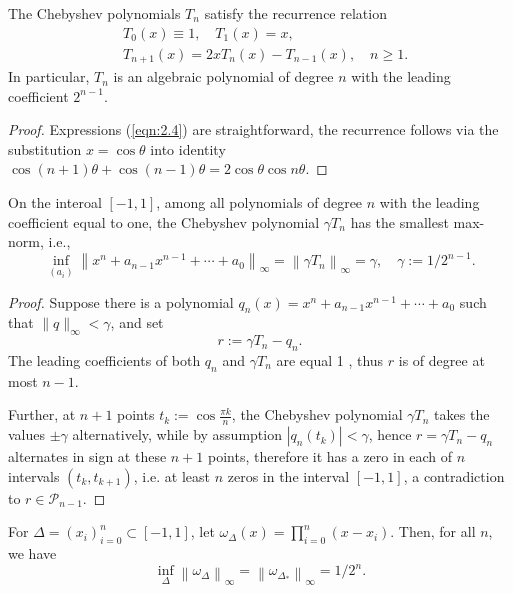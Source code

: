 \documentclass[a4paper]{article}
\begin{document}
\begin{lemma}
    The Chebyshev polynomials $T_n$ satisfy the recurrence relation
    \begin{align}
        & T_0(x) \equiv 1, \quad T_1(x)=x, \label{eqn:2.4}\\
        & T_{n+1}(x)=2 x T_n(x)-T_{n-1}(x), \quad n \geq 1 .\label{eqn:2.5}
    \end{align}
    In particular, $T_n$ is an algebraic polynomial of degree $n$ with the leading coefficient $2^{n-1}$.
\end{lemma}
\begin{proof}
    Expressions (\ref{eqn:2.4}) are straightforward, the recurrence follows via the substitution $x=\cos \theta$ into identity $\cos (n+1) \theta+\cos (n-1) \theta=2 \cos \theta \cos n \theta$.
\end{proof}

\begin{theorem}
    On the interoal $[-1,1]$, among all polynomials of degree $n$ with the leading coefficient equal to one, the Chebyshev polynomial $\gamma T_n$ has the smallest max-norm, i.e.,
    \[
    \inf _{\left(a_i\right)}\left\|x^n+a_{n-1} x^{n-1}+\cdots+a_0\right\|_{\infty}=\left\|\gamma T_n\right\|_{\infty}=\gamma, \quad \gamma:=1 / 2^{n-1} .
    \]
\end{theorem}
\begin{proof}
    Suppose there is a polynomial $q_n(x)=x^n+a_{n-1} x^{n-1}+\cdots+a_0$ such that $\|q\|_{\infty}<\gamma$, and set
    \[
    r:=\gamma T_n-q_n .
    \]
    The leading coefficients of both $q_n$ and $\gamma T_n$ are equal 1 , thus $r$ is of degree at most $n-1$.

    Further, at $n+1$ points $t_k:=\cos \frac{\pi k}{n}$, the Chebyshev polynomial $\gamma T_n$ takes the values $\pm \gamma$ alternatively, while by assumption $\left|q_n\left(t_k\right)\right|<\gamma$, hence $r=\gamma T_n-q_n$ alternates in sign at these $n+1$ points, therefore it has a zero in each of $n$ intervals $\left(t_k, t_{k+1}\right)$, i.e. at least $n$ zeros in the interval $[-1,1]$, a contradiction to $r \in \mathcal{P}_{n-1}$.
\end{proof}

\begin{corollary}
    For $\Delta=\left(x_i\right)_{i=0}^n \subset[-1,1]$, let $\omega_{\Delta}(x)=\prod_{i=0}^n\left(x-x_i\right)$. Then, for all $n$, we have
    \[
    \inf _{\Delta}\left\|\omega_{\Delta}\right\|_{\infty}=\left\|\omega_{{\Delta}_{*}}\right\|_{\infty}=1 / 2^n .
    \]
\end{corollary}
\end{document}
